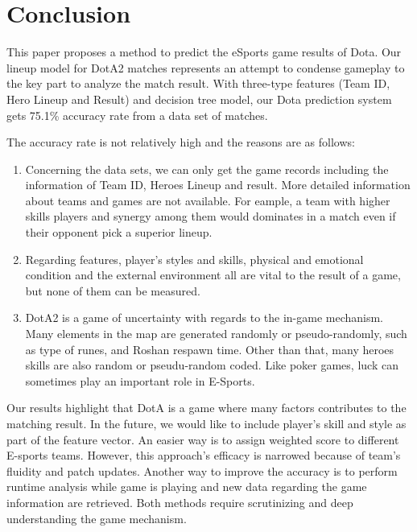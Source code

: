 \section{Conclusion}
This paper proposes a method to predict the eSports game results of Dota. Our lineup model for DotA2 matches represents an attempt to condense gameplay to the key part to analyze the match result. 
With three-type features (Team ID, Hero Lineup and Result) and decision tree model, our Dota prediction system gets 75.1\% accuracy rate from a data set of matches.
 
The accuracy rate is not relatively high and the reasons are as follows:
\begin{enumerate}
\item Concerning the data sets, we can only get the game records including the information of Team ID, Heroes Lineup and result.
More detailed information about teams and games are not available. For eample, a team with higher skills players and synergy among them would dominates in a match even if their opponent pick a superior lineup.

\item Regarding features, player’s styles and skills, physical and emotional condition and the external environment all are vital to the result of a game, but none of them can be measured.

\item DotA2 is a game of uncertainty with regards to the in-game mechanism. Many elements in the map are generated randomly or pseudo-randomly, such as type of runes, and Roshan respawn time. Other than that, many heroes skills are also random or pseudu-random coded.  Like poker games, luck can sometimes play an important role in E-Sports.

\end{enumerate}
Our results highlight that DotA is a game where many factors contributes to the matching result. In the future, we would like to include player's skill and style as part of the feature vector. An easier way is to assign weighted score to different E-sports teams. However, this approach's efficacy is narrowed because of team's fluidity and patch updates. Another way to improve the accuracy is to perform runtime analysis while game is playing and new data regarding the game information are retrieved. Both methods require scrutinizing and deep understanding the game mechanism.
